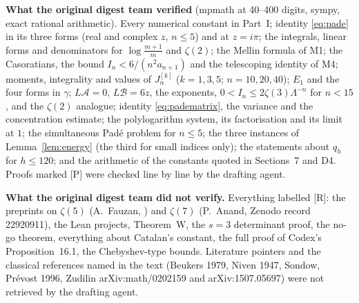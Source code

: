 \documentclass[11pt,a4paper]{article}
\newcommand{\cA}{\mathcal A}
\newcommand{\cB}{\mathcal B}
\newcommand{\st}[1]{\textsf{[#1]}}
\theoremstyle{definition}
\begin{document}
\noindent\textbf{What the original digest team verified} (mpmath at 40--400 digits, sympy, exact rational
arithmetic). Every numerical constant in Part~I; identity \eqref{eq:pade} in its three forms (real
and complex $z$, $n\le5$) and at $z=i\pi$; the integrals, linear forms and denominators for
$\log\frac{m+1}m$ and $\zeta(2)$; the Mellin formula of M1; the Casoratians, the bound
$I_n<6/(n^2a_{n+1})$ and the telescoping identity of M4; moments, integrality and values of
$J_n^{[k]}$ ($k=1,3,5$; $n=10,20,40$); $E_1$ and the four forms in $\gamma$; $L\cA=0$, $L\cB=6z$,
the exponents, $0<I_n\le2\zeta(3)\Lambda^{-n}$ for $n<15$, and the $\zeta(2)$ analogue; identity
\eqref{eq:padematrix}, the variance and the concentration estimate; the polylogarithm system, its
factorisation and its limit at $1$; the simultaneous Pad\'e problem for $n\le5$; the three instances
of Lemma~\ref{lem:energy} (the third for small indices only); the statements about $q_h$ for
$h\le120$; and the arithmetic of the constants quoted in Sections~7 and D4. Proofs marked \st{P} were checked line by line by the drafting agent.

\noindent\textbf{What the original digest team did not verify.} Everything labelled \st{R}: the preprints on $\zeta(5)$
(A.~Fauzan, ) and $\zeta(7)$ (P.~Anand, Zenodo record 22920911), the Lean
projects, Theorem~W, the $s=3$ determinant proof, the no-go theorem, everything about Catalan's
constant, the full proof of Codex's Proposition~16.1, the Chebyshev-type bounds. Literature pointers
and the classical references named in the text (Beukers 1979, Niven 1947, Sondow, Pr\'evost 1996,
Zudilin arXiv:math/0202159 and arXiv:1507.05697) were not retrieved by the drafting agent.

\endgroup
\end{document}
